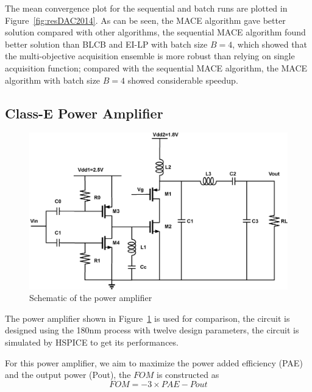 The mean convergence plot for the sequential and batch runs are plotted in
Figure~\ref{fig:resDAC2014}. As can be seen, the MACE algorithm gave better
solution compared with other algorithms, the sequential MACE algorithm found
better solution than BLCB and EI-LP with batch size $B = 4$, which showed that
the multi-objective acquisition ensemble is more robust than relying on single
acquisition function; compared with the sequential MACE algorithm, the MACE
algorithm with batch size $B = 4$ showed considerable speedup.


\subsection{Class-E Power Amplifier}


\begin{figure}[htbp]
    \begin{center}
        \centerline{\includegraphics[width=\columnwidth]{./img/classE.eps}}
        \caption{Schematic of the power amplifier}
        \label{fig:schPA}
    \end{center}
\end{figure}

The power amplifier shown in Figure~\ref{fig:schPA} is used for comparison, the
circuit is designed using the 180nm process with twelve design parameters, the
circuit is simulated by HSPICE to get its performances.

For this power amplifier, we aim to maximize the power added efficiency (PAE) and the output power (Pout), the $FOM$ is constructed as
$$
\mathit{FOM} = -3 \times \mathit{PAE} - \mathit{Pout}
$$

